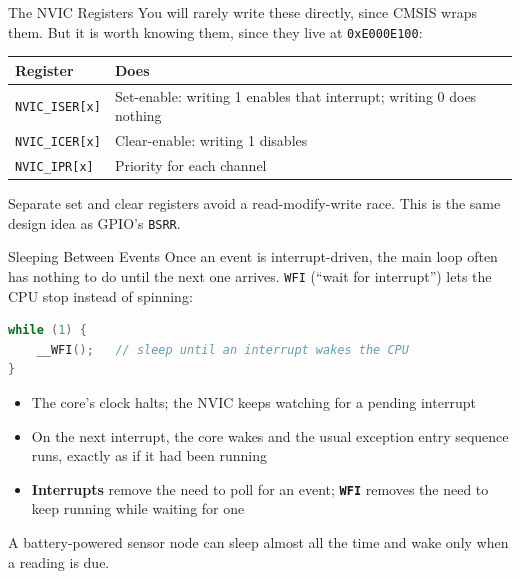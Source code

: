 \documentclass[9pt,aspectratio=169,xcolor=table]{beamer}
\newcommand{\striped}{\rowcolors{1}{white}{stripe}}
\begin{document}
\begin{frame}{The NVIC Registers}
    \leavevmode
    {\small You will rarely write these directly, since CMSIS wraps
    them. But it is worth knowing them, since they live at
    \texttt{0xE000E100}:}

	\begin{center}
    {\small
	\striped
	\begin{tabular}{@{}l p{8cm}@{}}
		\toprule
		\textbf{Register} & \textbf{Does} \\
		\midrule
		\texttt{NVIC\_ISER[x]} & Set-enable: writing 1 enables that
		interrupt; writing 0 does nothing \\
		\texttt{NVIC\_ICER[x]} & Clear-enable: writing 1 disables \\
		\texttt{NVIC\_IPR[x]}  & Priority for each channel \\
		\bottomrule
	\end{tabular}}
	\end{center}

    {\small Separate set and clear registers avoid a read-modify-write
    race. \alert{This is the same design idea as GPIO's \texttt{BSRR}}.}
\end{frame}

\begin{frame}[fragile]{Sleeping Between Events}
    \leavevmode
    {\small Once an event is interrupt-driven, the main loop often has
    nothing to do until the next one arrives. \alert{\texttt{WFI}}
    (``wait for interrupt'') lets the CPU stop instead of spinning:}

    \begin{lstlisting}[language=C]
while (1) {
    __WFI();   // sleep until an interrupt wakes the CPU
}
    \end{lstlisting}

    \begin{itemize}
        \item The core's clock halts; the NVIC keeps watching for a
              pending interrupt
        \item On the next interrupt, the core wakes and the usual
              exception entry sequence runs, exactly as if it had been
              running
        \item \textbf{Interrupts} remove the need to \alert{poll} for an
              event; \textbf{\texttt{WFI}} removes the need to
              \alert{keep running} while waiting for one
    \end{itemize}

    \vspace{1mm}
    {\small A battery-powered sensor node can sleep almost all the
    time and wake only when a reading is due.}
\end{frame}
\end{document}
